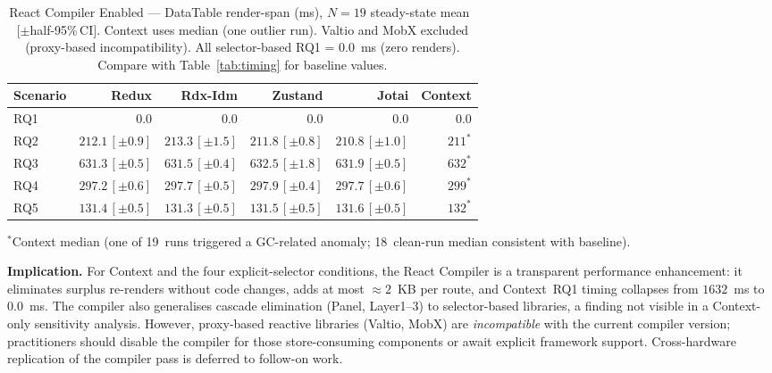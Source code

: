 \documentclass[conference]{IEEEtran}
\begin{document}
\begin{table}[!ht]
\caption{React Compiler Enabled --- DataTable render-span
  (ms), $N{=}19$ steady-state mean~$[\pm$half-95\%\,CI$]$.
  Context uses median (one outlier run).
  Valtio and MobX excluded (proxy-based incompatibility).
  All selector-based RQ1 = $0.0$~ms (zero renders).
  Compare with Table~\ref{tab:timing} for baseline values.}
\label{tab:compiler-timing}
\begin{center}
\small
\setlength{\tabcolsep}{3pt}
\begin{tabular}{lrrrrr}
\toprule
\textbf{Scenario}
  & \textbf{Redux}
  & \textbf{Rdx-Idm}
  & \textbf{Zustand}
  & \textbf{Jotai}
  & \textbf{Context} \\
\midrule
RQ1  & $0.0$  & $0.0$  & $0.0$   & $0.0$   & $0.0$ \\
RQ2  & $212.1\,[\pm0.9]$  & $213.3\,[\pm1.5]$
     & $211.8\,[\pm0.8]$  & $210.8\,[\pm1.0]$   & $211^*$ \\
RQ3  & $631.3\,[\pm0.5]$  & $631.5\,[\pm0.4]$
     & $632.5\,[\pm1.8]$  & $631.9\,[\pm0.5]$   & $632^*$ \\
RQ4  & $297.2\,[\pm0.6]$  & $297.7\,[\pm0.5]$
     & $297.9\,[\pm0.4]$  & $297.7\,[\pm0.6]$   & $299^*$ \\
RQ5  & $131.4\,[\pm0.5]$  & $131.3\,[\pm0.5]$
     & $131.5\,[\pm0.5]$  & $131.6\,[\pm0.5]$   & $132^*$ \\
\bottomrule
\end{tabular}
\end{center}
\parbox{\columnwidth}{\scriptsize
$^*$Context median (one of 19~runs triggered a GC-related anomaly;
18~clean-run median consistent with baseline).}
\end{table}

\textbf{Implication.}
For Context and the four explicit-selector conditions, the React
Compiler is a transparent performance enhancement: it eliminates
surplus re-renders without code changes, adds at most ${\approx}2$~KB
per route, and Context~RQ1 timing collapses from $1632$~ms to
$0.0$~ms.  The compiler also generalises cascade elimination
(Panel, Layer1--3) to selector-based libraries, a finding not visible
in a Context-only sensitivity analysis.
However, proxy-based reactive libraries (Valtio, MobX) are
\emph{incompatible} with the current compiler version; practitioners
should disable the compiler for those store-consuming components
or await explicit framework support.
Cross-hardware replication of the compiler pass is deferred to
follow-on work.
\end{document}
